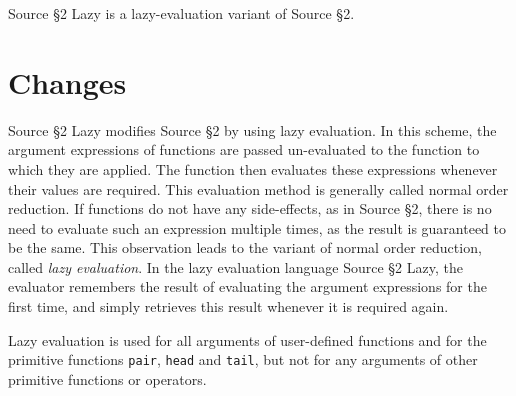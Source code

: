 





Source \S 2 Lazy is a lazy-evaluation variant of Source \S 2.

\section*{Changes}

Source \S 2 Lazy modifies Source \S 2 by using
lazy evaluation. In
this scheme, the argument expressions of functions are passed un-evaluated
to the function to which they are applied. The function then evaluates
these expressions whenever their values are required. This evaluation
method is generally
called normal order reduction. If functions
do not have any side-effects, as in Source \S 2,
there is no need to evaluate such an expression
multiple times, as the result is guaranteed to be the same. This observation
leads to the variant of normal order reduction, called \emph{lazy evaluation}.
In the lazy evaluation language Source \S 2 Lazy,
the evaluator remembers the result of evaluating the
argument expressions for the first time, and simply retrieves this result
whenever it is required again.

Lazy evaluation is used for all arguments of user-defined functions and
for the primitive functions \lstinline{pair}, \lstinline{head} and
\lstinline{tail}, but
not for any arguments of other primitive functions or operators.

\newpage























\newpage



    
